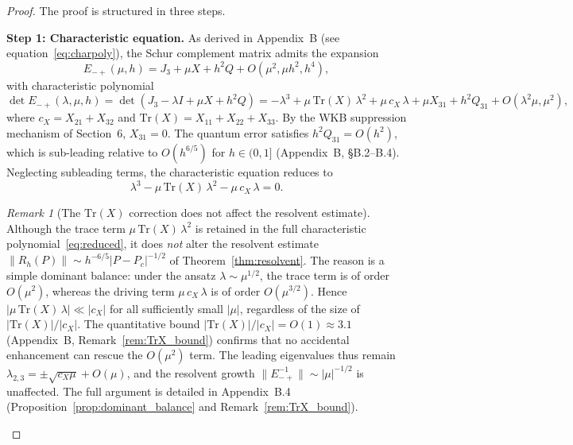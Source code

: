 \documentclass[12pt,a4paper]{amsart}
\theoremstyle{remark}
\newtheorem{remark}[theorem]{Remark}
\begin{document}
\begin{proof}
The proof is structured in three steps.

\textbf{Step 1: Characteristic equation.}
As derived in Appendix~B (see equation~\eqref{eq:charpoly}), the Schur complement matrix admits the expansion
\[
  E_{-+}(\mu,h) = J_3 + \mu X + h^2 Q + O(\mu^2, \mu h^2, h^4),
\]
with characteristic polynomial
\[
  \det E_{-+}(\lambda,\mu,h)
  = \det(J_3 - \lambda I + \mu X + h^2 Q)
  = -\lambda^3 + \mu\,\mathrm{Tr}(X)\,\lambda^2
    + \mu\,c_X\,\lambda
    + \mu X_{31} + h^2 Q_{31} + O(\lambda^2\mu,\mu^2),
\]
where $c_X = X_{21}+X_{32}$ and $\mathrm{Tr}(X) = X_{11}+X_{22}+X_{33}$.
By the WKB suppression mechanism of Section~6, $X_{31} = 0$.
The quantum error satisfies $h^2 Q_{31} = O(h^2)$, which is sub-leading
relative to $O(h^{6/5})$ for $h \in (0,1]$ (Appendix~B, \S B.2--B.4).
Neglecting subleading terms, the characteristic equation reduces to
\begin{equation}\label{eq:reduced}
  \lambda^3 - \mu\,\mathrm{Tr}(X)\,\lambda^2 - \mu\,c_X\,\lambda = 0.
\end{equation}

\begin{remark}[The $\mathrm{Tr}(X)$ correction does not affect the resolvent estimate]
\label{rem:trX_resolvent}
Although the trace term $\mu\,\mathrm{Tr}(X)\,\lambda^2$ is retained in the full
characteristic polynomial~\eqref{eq:reduced}, it does \emph{not} alter the resolvent
estimate $\|R_h(P)\| \sim h^{-6/5}|P-P_c|^{-1/2}$ of Theorem~\ref{thm:resolvent}.
The reason is a simple dominant balance: under the ansatz $\lambda \sim \mu^{1/2}$,
the trace term is of order $O(\mu^2)$, whereas the driving term $\mu\,c_X\,\lambda$
is of order $O(\mu^{3/2})$.
Hence $|\mu\,\mathrm{Tr}(X)\,\lambda| \ll |c_X|$ for all sufficiently small $|\mu|$,
regardless of the size of $|\mathrm{Tr}(X)|/|c_X|$.
The quantitative bound $|\mathrm{Tr}(X)|/|c_X| = O(1) \approx 3.1$ (Appendix~B,
Remark~\ref{rem:TrX_bound}) confirms that no accidental enhancement can rescue the
$O(\mu^2)$ term.
The leading eigenvalues thus remain $\lambda_{2,3} = \pm\sqrt{c_X\mu} + O(\mu)$, and
the resolvent growth $\|E_{-+}^{-1}\| \sim |\mu|^{-1/2}$ is unaffected.
The full argument is detailed in Appendix~B.4 (Proposition~\ref{prop:dominant_balance}
and Remark~\ref{rem:TrX_bound}).
\end{remark}


\end{proof}
\end{document}
